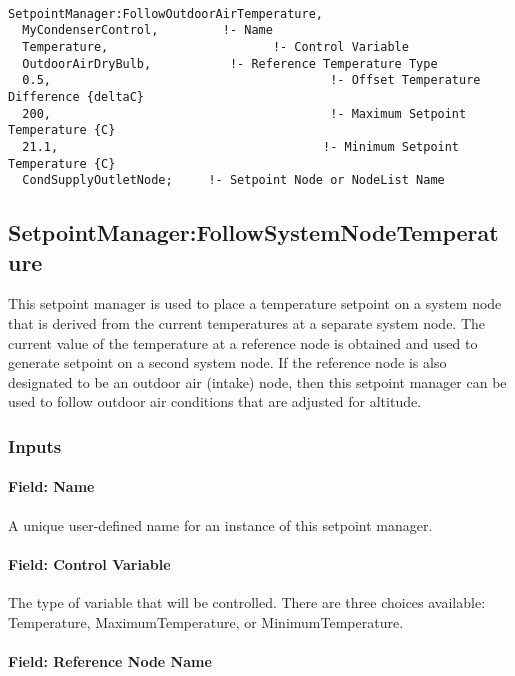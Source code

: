 \begin{lstlisting}

SetpointManager:FollowOutdoorAirTemperature,
  MyCondenserControl,         !- Name
  Temperature,                       !- Control Variable
  OutdoorAirDryBulb,           !- Reference Temperature Type
  0.5,                                       !- Offset Temperature Difference {deltaC}
  200,                                       !- Maximum Setpoint Temperature {C}
  21.1,                                     !- Minimum Setpoint Temperature {C}
  CondSupplyOutletNode;     !- Setpoint Node or NodeList Name
\end{lstlisting}

\subsection{SetpointManager:FollowSystemNodeTemperature}\label{setpointmanagerfollowsystemnodetemperature}

This setpoint manager is used to place a temperature setpoint on a system node that is derived from the current temperatures at a separate system node. The current value of the temperature at a reference node is obtained and used to generate setpoint on a second system node. If the reference node is also designated to be an outdoor air (intake) node, then this setpoint manager can be used to follow outdoor air conditions that are adjusted for altitude.

\subsubsection{Inputs}\label{inputs-21-005}

\paragraph{Field: Name}\label{field-name-21-002}

A unique user-defined name for an instance of this setpoint manager.

\paragraph{Field: Control Variable}\label{field-control-variable-15}

The type of variable that will be controlled. There are three choices available: Temperature, MaximumTemperature, or MinimumTemperature.

\paragraph{Field: Reference Node Name}\label{field-reference-node-name}

